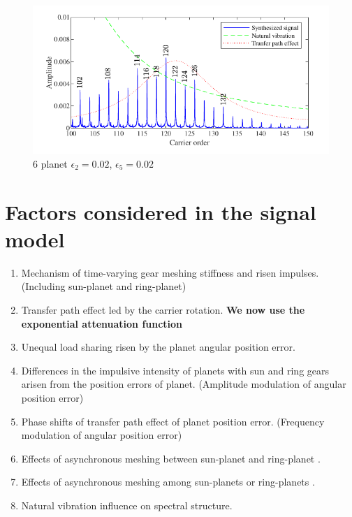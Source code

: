 \documentclass[a4paper,fleqn]{cas-sc}%
\begin{document}
\begin{figure}[pos=htbp]
    \centering
    \includegraphics[scale=1]{Figures/6_planet_2_th_0_02_5_th_0.02_fourier.pdf}
    \caption{6 planet $\epsilon_2=0.02$\degree, $\epsilon_5=0.02$\degree}
    \label{fig:6_planet_2_th_0_02_5_th_0.02_fourier}
\end{figure}
\section{Factors considered in the signal model}
\begin{enumerate}
    \item Mechanism of time-varying gear meshing stiffness and risen impulses. (Including sun-planet and ring-planet)
    \item Transfer path effect led by the carrier rotation. \textbf{We now use the exponential attenuation function}
    \item Unequal load sharing risen by the planet angular position error.
    \item Differences in the impulsive intensity of planets with sun and ring gears arisen from the position errors of planet. (Amplitude modulation of angular position error)
    \item Phase shifts of transfer path effect of planet position error. (Frequency modulation of angular position error)
    \item Effects of asynchronous meshing between sun-planet and ring-planet \cite{Parker2004}.
    \item Effects of asynchronous meshing among sun-planets or ring-planets \cite{Inalpolat2009}.
    \item Natural vibration influence on spectral structure.
\end{enumerate}
\end{document}
